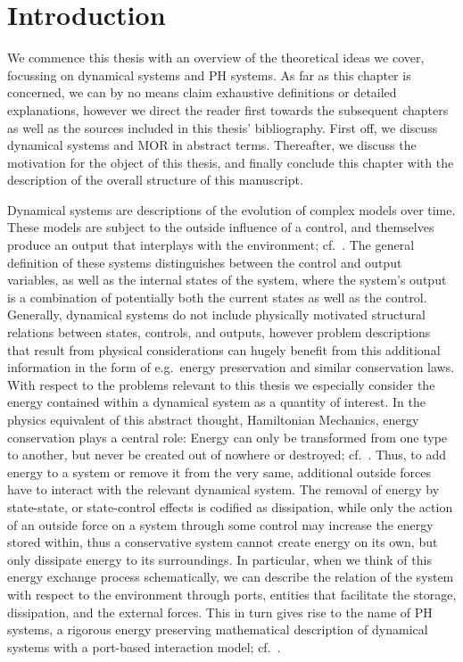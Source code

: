 \chapter{Introduction}\label{chap:introduction}

We commence this thesis with an overview of the theoretical ideas we cover, focussing on dynamical systems and \ac{PH} systems.
As far as this chapter is concerned, we can by no means claim exhaustive definitions or detailed explanations, however we direct the reader first towards the subsequent chapters as well as the sources included in this thesis' bibliography.
First off, we discuss dynamical systems and \ac{MOR} in abstract terms.
Thereafter, we discuss the motivation for the object of this thesis, and finally conclude this chapter with the description of the overall structure of this manuscript.

Dynamical systems are descriptions of the evolution of complex models over time.
These models are subject to the outside influence of a control, and themselves produce an output that interplays with the environment; cf.~\cite{Hinrichsen2005}.
The general definition of these systems distinguishes between the control and output variables, as well as the internal states of the system, where the system's output is a combination of potentially both the current states as well as the control.
Generally, dynamical systems do not include physically motivated structural relations between states, controls, and outputs, however problem descriptions that result from physical considerations can hugely benefit from this additional information in the form of e.g.\ energy preservation and similar conservation laws.
With respect to the problems relevant to this thesis we especially consider the energy contained within a dynamical system as a quantity of interest.
In the physics equivalent of this abstract thought, Hamiltonian Mechanics, energy conservation plays a central role: Energy can only be transformed from one type to another, but never be created out of nowhere or destroyed; cf.~\cite{Taylor2005, Giorgilli2022}.
Thus, to add energy to a system or remove it from the very same, additional outside forces have to interact with the relevant dynamical system.
The removal of energy by state-state, or state-control effects is codified as dissipation, while only the action of an outside force on a system through some control may increase the energy stored within, thus a conservative system cannot create energy on its own, but only dissipate energy to its surroundings.
In particular, when we think of this energy exchange process schematically, we can describe the relation of the system with respect to the environment through ports, entities that facilitate the storage, dissipation, and the external forces.
This in turn gives rise to the name of \ac{PH} systems, a rigorous energy preserving mathematical description of dynamical systems with a port-based interaction model; cf.~\cite{Duindam2009, Jacob2012, VanDerSchaft2014, Mehrmann2023}.

